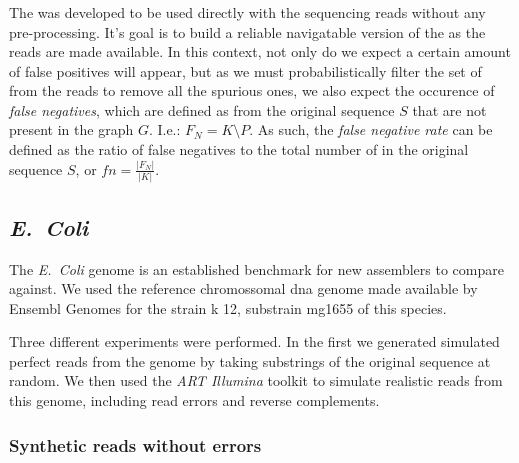 \subsubsection{\dBCM}

The \dBCM was developed to be used directly with the sequencing reads without any pre-processing. It's goal is to build a reliable
navigatable version of the \dBG as the reads are made available. In this context, not only do we expect a certain amount of false
positives will appear, but as we must probabilistically filter the set of \kmers from the reads to remove all the spurious ones, we
also expect the occurence of \emph{false negatives}, which are defined as \kmers from the original sequence $S$ that are not present
in the graph $G$. I.e.: $F_N=K \setminus P$. As such, the \emph{false negative rate} can be defined as the ratio of false negatives
to the total number of \kmers in the original sequence $S$, or $\mathit{fn}=\frac{|F_N|}{|K|}$.

\subsubsection{\dBHT}

\subsection{\emph{E.~Coli}}

The \emph{E.~Coli} genome is an established benchmark for new assemblers to compare against. We used the reference chromossomal dna
genome made available by Ensembl Genomes for the strain k 12, substrain mg1655 of this species\cite{ecoligenome}.


Three different experiments were performed. In the first we generated simulated perfect reads from the genome by taking substrings of 
the original sequence at random. We then used the \emph{ART Illumina} toolkit  to simulate realistic reads from this
genome, including read errors and reverse complements. 

\subsubsection{Synthetic reads without errors}

